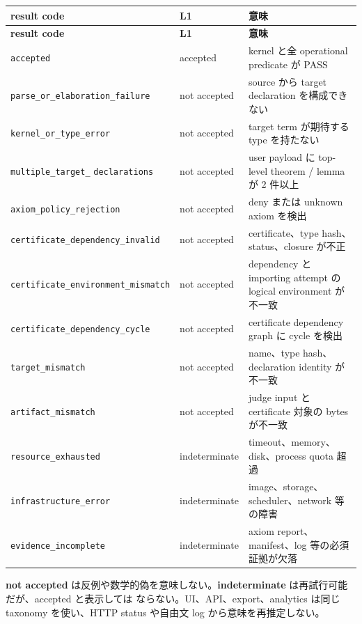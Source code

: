 \documentclass[a4paper,11pt]{ltjsarticle}
\newcommand{\term}[1]{\textbf{\color{TFNavy}#1}}
\newcommand{\code}[1]{\texttt{#1}}
\begin{document}
\begin{longtable}{L{39mm}L{29mm}L{75mm}}
\toprule
\textbf{result code} & \textbf{L1} & \textbf{意味} \\
\midrule
\endfirsthead
\toprule
\textbf{result code} & \textbf{L1} & \textbf{意味} \\
\midrule
\endhead
\code{accepted} & accepted & kernel と全 operational predicate が PASS \\
\code{parse\_or\_}\newline\code{elaboration\_failure} & not accepted & source から target declaration を構成できない \\
\code{kernel\_or\_type\_error} & not accepted & target term が期待する type を持たない \\
\code{multiple\_target\_}
\newline\code{declarations} & not accepted & user payload に top-level theorem / lemma が 2 件以上 \\
\code{axiom\_policy\_rejection} & not accepted & deny または unknown axiom を検出 \\
\code{certificate\_}\newline\code{dependency\_invalid} & not accepted & certificate、type hash、status、closure が不正 \\
\code{certificate\_}\newline\code{environment\_}\newline\code{mismatch} & not accepted & dependency と importing attempt の logical environment が不一致 \\
\code{certificate\_}\newline\code{dependency\_cycle} & not accepted & certificate dependency graph に cycle を検出 \\
\code{target\_mismatch} & not accepted & name、type hash、declaration identity が不一致 \\
\code{artifact\_mismatch} & not accepted & judge input と certificate 対象の bytes が不一致 \\
\code{resource\_exhausted} & indeterminate & timeout、memory、disk、process quota 超過 \\
\code{infrastructure\_error} & indeterminate & image、storage、scheduler、network 等の障害 \\
\code{evidence\_incomplete} & indeterminate & axiom report、manifest、log 等の必須証拠が欠落 \\
\bottomrule
\end{longtable}

\term{not accepted} は反例や数学的偽を意味しない。\term{indeterminate} は再試行可能だが、accepted と表示しては
ならない。UI、API、export、analytics は同じ taxonomy を使い、HTTP status や自由文 log から意味を再推定しない。
\end{document}

